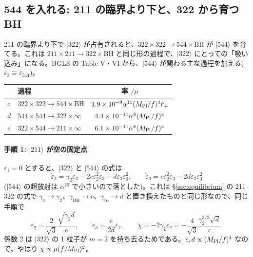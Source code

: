 \subsection{544 を入れる: 211 の臨界より下と、322 から育つ BH}\label{sec:three_level}

211 の臨界より下で $|322\rangle$ が占有されると、$322\times322\to544\times\mathrm{BH}$ が $|544\rangle$ を育てる。これは $211\times211\to322\times\mathrm{BH}$ と同じ形の過程で、$|322\rangle$ にとっての「吸い込み」になる。BGLS の Table V・VI から、$|544\rangle$ が関わる主な過程を加える($\varepsilon_3\equiv\varepsilon_{544}$)。
\begin{center}\small
\begin{tabular}{llc}
\toprule
 & 過程 & 率 $/\mu$ \\
\midrule
$c$ & $322\times322\to544\times\mathrm{BH}$ & $1.9\times10^{-9}\alpha^{11}(M_\mathrm{Pl}/f)^4\tilde r_+$ \\
$d$ & $544\times544\to322\times\infty$ & $4.4\times10^{-11}\alpha^{8}(M_\mathrm{Pl}/f)^4$ \\
$e$ & $322\times544\to211\times\infty$ & $6.1\times10^{-11}\alpha^{8}(M_\mathrm{Pl}/f)^4$ \\
\bottomrule
\end{tabular}
\end{center}

\paragraph{手順 1: $|211\rangle$ が空の固定点}
$\varepsilon_1=0$ とすると、$|322\rangle$ と $|544\rangle$ の式は
\begin{equation}
\dot\varepsilon_2=\gamma_2\varepsilon_2-2c\varepsilon_2^2\varepsilon_3+d\varepsilon_2\varepsilon_3^2,\qquad
\dot\varepsilon_3=c\varepsilon_2^2\varepsilon_3-2d\varepsilon_2\varepsilon_3^2
\end{equation}
($|544\rangle$ の超放射は $\alpha^{20}$ で小さいので落とした)。これは \S\ref{sec:equilibrium} の 211--322 の式で $\gamma_1\to\gamma_2$、$\gamma_\mathrm{BH}\to c$、$\gamma_\infty\to d$ と置き換えたものと同じ形なので、同じ手順で
\begin{equation}
\varepsilon_2=\frac{2}{\sqrt3}\frac{\sqrt{\gamma_2d}}{c},\qquad \varepsilon_3=\frac{c}{2d}\varepsilon_2,\qquad
\dot\chi=-2\gamma_2\varepsilon_2=-\frac{4}{\sqrt3}\frac{\gamma_2^{3/2}\sqrt d}{c}.
\end{equation}
係数 2 は $|322\rangle$ の 1 粒子が $m=2$ を持ち去るためである。$c,d\propto(M_\mathrm{Pl}/f)^4$ なので、やはり $\dot\chi\propto\mu(f/M_\mathrm{Pl})^2$。

